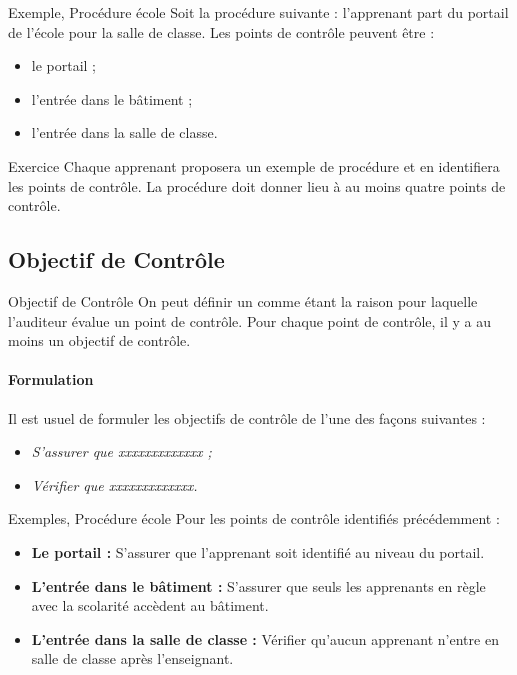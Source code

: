 \begin{boxlizbiz}{Exemple, Procédure école}
Soit la procédure suivante : l'apprenant part du portail de l'école pour la salle de
classe. Les points de contrôle peuvent être :
\begin{itemize}
  \item le portail ;
  \item l'entrée dans le bâtiment ;
  \item l'entrée dans la salle de classe.
\end{itemize}
\end{boxlizbiz}

\begin{boxexo}{Exercice}
Chaque apprenant proposera un exemple de procédure et en identifiera les points de
contrôle. La procédure doit donner lieu à au moins quatre points de contrôle.
\end{boxexo}

\subsection{Objectif de Contrôle}

\begin{boxdef}{Objectif de Contrôle}
On peut définir un  comme étant la raison pour laquelle
l'auditeur évalue un point de contrôle. Pour chaque point de contrôle, il y a au
moins un objectif de contrôle.
\end{boxdef}

\paragraph{Formulation}
Il est usuel de formuler les objectifs de contrôle de l'une des façons suivantes :
\begin{itemize}
  \item \emph{S'assurer que xxxxxxxxxxxxx ;}
  \item \emph{Vérifier que xxxxxxxxxxxxx.}
\end{itemize}

\begin{boxlizbiz}{Exemples, Procédure école}
Pour les points de contrôle identifiés précédemment :
\begin{itemize}
  \item \textbf{Le portail :} S'assurer que l'apprenant soit identifié au niveau du portail.
  \item \textbf{L'entrée dans le bâtiment :} S'assurer que seuls les apprenants en règle
    avec la scolarité accèdent au bâtiment.
  \item \textbf{L'entrée dans la salle de classe :} Vérifier qu'aucun apprenant n'entre en
    salle de classe après l'enseignant.
\end{itemize}
\end{boxlizbiz}

